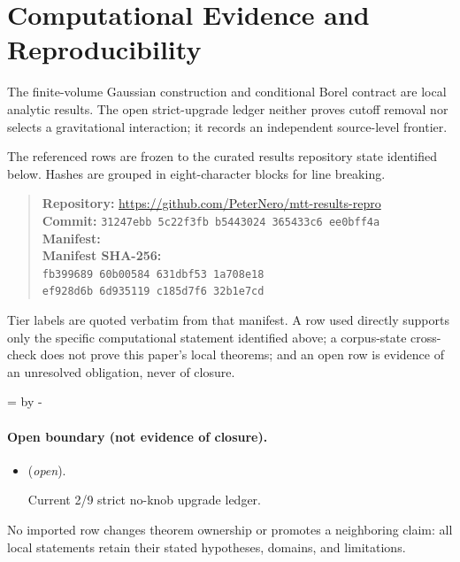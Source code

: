 \documentclass[11pt]{article}
\begin{document}
\section*{Computational Evidence and Reproducibility}
The finite-volume Gaussian construction and conditional Borel contract are local analytic results. The open strict-upgrade ledger neither proves cutoff removal nor selects a gravitational interaction; it records an independent source-level frontier.

The referenced rows are frozen to the curated results repository state identified below. Hashes are grouped in eight-character blocks for line breaking.
\begin{quote}\small
\textbf{Repository:} \url{https://github.com/PeterNero/mtt-results-repro}\\
\textbf{Commit:} \texttt{31247ebb 5c22f3fb b5443024 365433c6 ee0bff4a}\\
\textbf{Manifest:} \\
\textbf{Manifest SHA-256:}\\
\texttt{fb399689 60b00584 631dbf53 1a708e18}\\
\texttt{ef928d6b 6d935119 c185d7f6 32b1e7cd}
\end{quote}

Tier labels are quoted verbatim from that manifest. A row used directly supports only the specific computational statement identified above; a corpus-state cross-check does not prove this paper's local theorems; and an open row is evidence of an unresolved obligation, never of closure.

\par\begingroup{}=\pagegoal\advance{} by -\pagetotal\ifdim\dimen0<7\baselineskip\newpage\fi\endgroup
\paragraph{Open boundary (not evidence of closure).}
\begin{itemize}
\setlength{\itemsep}{0.25em}
\item {} (\emph{open}).\par Current 2/9 strict no-knob upgrade ledger.
\end{itemize}

No imported row changes theorem ownership or promotes a neighboring claim: all local statements retain their stated hypotheses, domains, and limitations.
\end{document}
